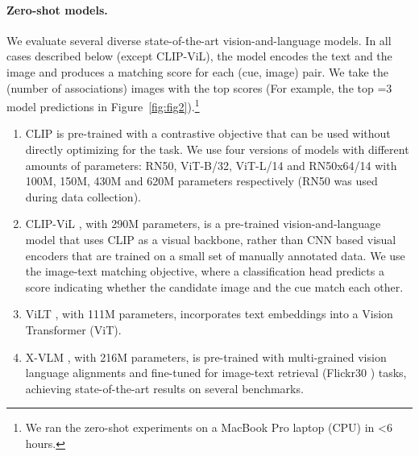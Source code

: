 \documentclass{article}
\begin{document}
\paragraph{Zero-shot models.} We evaluate several diverse state-of-the-art vision-and-language models. 
In all cases described below (except CLIP-ViL), the model encodes the text and the image and produces a matching score for each (cue, image) pair. We take the  (number of associations) images with the top scores (For example, the top =3 model predictions in Figure~\ref{fig:fig2}).\footnote{We ran the zero-shot experiments on a MacBook Pro laptop (CPU) in <6 hours.}

\begin{enumerate}
    \item CLIP \cite{radford2021learning} is pre-trained with a contrastive objective that can be used without directly optimizing for the task. We use four versions of models with different amounts of parameters: RN50, ViT-B/32, ViT-L/14 and RN50x64/14 with 100M, 150M, 430M and 620M parameters respectively (RN50 was used during data collection).
    \item CLIP-ViL \cite{shen2021much}, with 290M parameters, is a pre-trained vision-and-language model that uses CLIP as a visual backbone, rather than CNN based visual encoders that are trained on a small set of manually annotated data. We use the image-text matching objective, where a classification head predicts a score indicating whether the candidate image and the cue match each other. 
    \item ViLT \cite{kim2021vilt}, with 111M parameters, incorporates text embeddings into a Vision Transformer (ViT).
\item X-VLM \cite{zeng2021multi}, with 216M parameters, is pre-trained with multi-grained vision language alignments and fine-tuned for image-text retrieval (Flickr30 \cite{plummer2015flickr30k}) tasks, achieving state-of-the-art results on several benchmarks.
\end{enumerate} 
\end{document}
